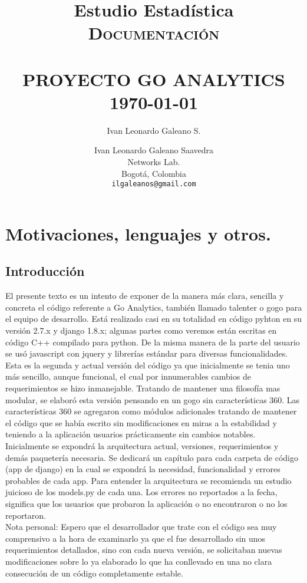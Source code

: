 \documentclass[10pt,a4paper]{book}
\author{Ivan Leonardo Galeano S.}
\title{Estudio Estadística}
\title{	\normalsize \textsc{Documentación}
	\\[2.0cm]
	\HRule{0.5pt} \\
	\LARGE \textbf{\uppercase{Proyecto Go Analytics}}
	\HRule{2pt} \\ [0.5cm]
	\normalsize \today
}
\author{
	Ivan Leonardo Galeano Saavedra\\
	Networks Lab.\\
	Bogotá, Colombia\\
	\texttt{ilgaleanos@gmail.com} \\
}
\makeatletter
\def\printtitle{
	{\centering \@title\par}}
\def\printauthor{
	{\centering \large \@author}}
\makeatother
\begin{document}
	\thispagestyle{empty}
	\printtitle
	\vfill
	\printauthor

	\tableofcontents

	\chapter{Motivaciones, lenguajes y otros.}

	\section*{Introducción}
	
	El presente texto es un intento de exponer de la manera más clara, sencilla y concreta el código referente a Go Analytics, también llamado talenter o gogo para el equipo de desarrollo. Está realizado casi en su totalidad en código pyhton en su versión 2.7.x y django 1.8.x; algunas partes como veremos están escritas en código C++ compilado para python. De la misma manera de la parte del usuario se usó javascript con jquery y librerías estándar para diversas funcionalidades.\\
	
	Esta es la segunda y actual versión del código ya que inicialmente se tenia uno más sencillo, aunque funcional, el cual por innumerables cambios de requerimientos se hizo inmanejable. Tratando de mantener una filosofía mas modular, se elaboró esta versión pensando en un gogo sin características 360. Las características 360 se agregaron como módulos adicionales tratando de mantener el código que se había escrito sin modificaciones en miras a la estabilidad y teniendo a la aplicación usuarios prácticamente sin cambios notables.\\
	
	Inicialmente se expondrá la arquitectura actual, versiones, requerimientos y demás paquetería necesaria. Se dedicará un capítulo para cada carpeta de código (app de django) en la cual se expondrá la necesidad, funcionalidad y errores probables de cada app. Para entender la arquitectura se recomienda un estudio juicioso de los models.py de cada una. Los errores no reportados a la fecha, significa que los usuarios que probaron la aplicación o no encontraron o no los reportaron.\\
	
	Nota personal: Espero que el desarrollador que trate con el código sea muy comprensivo a la hora de examinarlo ya que el fue desarrollado sin unos requerimientos detallados, sino con cada nueva versión, se solicitaban nuevas modificaciones sobre lo ya elaborado lo que ha conllevado en una no clara consecución de un código completamente estable.\\
	
\end{document}
